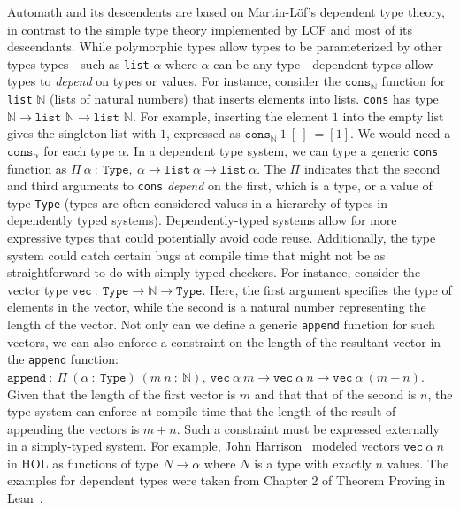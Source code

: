 \documentclass{article}
\begin{document}
  	Automath and its descendents are 
  	based on Martin-L\"{o}f's dependent 
  	type theory, in contrast to the
  	simple type theory implemented by  
  	LCF and most of	its descendants. 
  	While polymorphic 
  	types allow types to be 
  	parameterized by other types 
  	types - such as \texttt{list}
  	$ \alpha$ where $\alpha$ can be 
  	any type - dependent types allow 
  	types to \textit{depend} on 
  	types or values. For instance, 
  	consider the 
  	$\texttt{cons}_{\mathbb{N}}$
  	function for \texttt{list} 
  	$\mathbb{N}$ (lists of natural 
  	numbers) that inserts elements into 
  	lists. \texttt{cons} has type 
  	$\mathbb{N}	\to \texttt{list } 
  	\mathbb{N} \to \texttt{list } 
  	\mathbb{N}$. For example, 
  	inserting the element $1$ into 
  	the empty list gives the 
  	singleton list with $1$, expressed
  	as $\texttt{cons}_{\mathbb{N}}\ 
  	1\ [\ ]\ = [1]$. We would need 
  	a $\texttt{cons}_{\alpha}$ for 
  	each type $\alpha$. In a 
  	dependent type system, we can 
  	type a generic \texttt{cons} 
  	function as $\Pi\ \alpha\ :\ 
  	\texttt{Type},\ \alpha \to 
  	\texttt{list}\ \alpha \to 
  	\texttt{list}\ \alpha$. The 
  	$\Pi$ indicates that the 
  	second and third arguments 
  	to \texttt{cons} \textit{depend}
  	on the first, which is a type, 
  	or a value of type \texttt{Type} 
  	(types are often considered 
  	values in a hierarchy
  	of types in dependently typed 
  	systems). Dependently-typed 
  	systems allow for more expressive
  	types that could potentially 
  	avoid code reuse. Additionally, 
  	the type system could catch 
  	certain bugs at compile time
  	that might not be as 
  	straightforward to do with 
  	simply-typed checkers. For 
  	instance, consider the 
  	vector type $\texttt{vec}\ 
  	:\ \texttt{Type} \to \mathbb{N}
  	\to \texttt{Type}$. Here, the 
  	first argument specifies the 
  	type of elements in the vector, 
  	while the second is a natural 
  	number representing the 
  	length of the vector. Not 
  	only can we define a generic
  	\texttt{append} function for 
  	such vectors, we can also 
  	enforce a constraint on the 
  	length of the resultant vector
  	in the \texttt{append} function:
  	$\texttt{append}\ :\ \Pi\ 
  	(\alpha\ :\ \texttt{Type})\ 
  	(m\ n\ :\ \mathbb{N}),\ 
  	\texttt{vec}\ \alpha\ m \to 
  	\texttt{vec}\ \alpha\ n \to 
  	\texttt{vec}\ \alpha\ (m + n)$.
  	Given that the length of the 
  	first vector is $m$ and that 
  	that of the	second is $n$, the 
  	type system	can enforce at compile 
  	time that the length of the result 
  	of appending the vectors is 
  	$m + n$. Such a constraint 
  	must be expressed externally 
  	in a simply-typed system. For 
  	example, John 
  	Harrison~\cite{10.1007/11541868_8} 
  	modeled vectors $\texttt{vec}\ 
  	\alpha\ n$ in HOL as functions 
  	of type	$N \to \alpha$ where $N$ 
  	is a type with exactly $n$ values. 
  	The examples for dependent 
  	types were taken from 
  	Chapter 2 of Theorem Proving 
  	in Lean~\cite{avigad2016theorem}.
  
\end{document}
